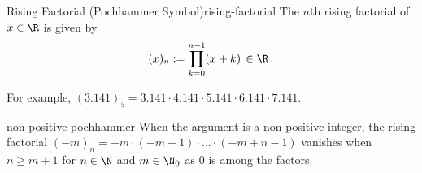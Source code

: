 \begin{definition}{Rising Factorial (Pochhammer Symbol)}{rising-factorial}
  The $n$th rising factorial of $x \in \R$ is given by
  $$(x)_n := \prod_{k=0}^{n-1} (x+k) \,\in \R\,.$$
\end{definition}

For example, $(3.141)_5 = 3.141 \cdot 4.141 \cdot 5.141 \cdot 6.141 \cdot 7.141$.

\begin{remark}{}{non-positive-pochhammer}
  When the argument is a non-positive integer, the rising factorial
  $(-m)_n = -m \cdot (-m+1) \cdot ... \cdot (-m+n-1)$
  vanishes when $n \ge m+1$ for $n \in \N$ and $m \in \N_0$ as $0$ is among the factors.
\end{remark}
